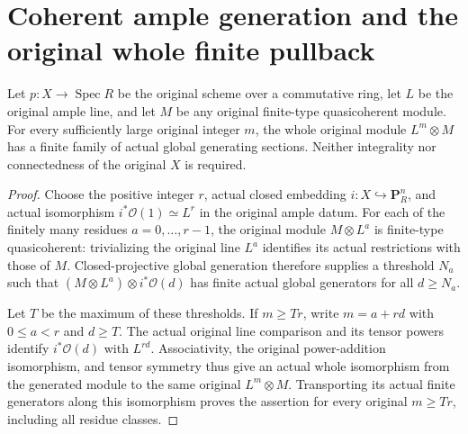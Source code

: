 \section{Coherent ample generation and the original whole finite pullback}

\begin{theorem}
\label{thm:kn-nadel-ample-coherent-generation}
\leanok
{}
Let $p:X\to\operatorname{Spec}R$ be the original scheme over a commutative
ring, let $L$ be the original ample line, and let $M$ be any original
finite-type quasicoherent module. For every sufficiently large original
integer $m$, the whole original module $L^m\otimes M$ has a finite family
of actual global generating sections. Neither integrality nor connectedness
of the original $X$ is required.
\end{theorem}
\begin{proof}
Choose the positive integer $r$, actual closed embedding
$i:X\hookrightarrow\mathbf P^n_R$, and actual isomorphism
$i^*\mathcal O(1)\simeq L^r$ in the original ample datum. For each of
the finitely many residues $a=0,\ldots,r-1$, the original module
$M\otimes L^a$ is finite-type quasicoherent: trivializing the original
line $L^a$ identifies its actual restrictions with those of $M$.
Closed-projective global generation therefore supplies a threshold $N_a$
such that $(M\otimes L^a)\otimes i^*\mathcal O(d)$ has finite actual
global generators for all $d\geq N_a$.

Let $T$ be the maximum of these thresholds. If $m\geq Tr$, write
$m=a+rd$ with $0\leq a<r$ and $d\geq T$. The actual original line
comparison and its tensor powers identify $i^*\mathcal O(d)$ with
$L^{rd}$. Associativity, the original power-addition isomorphism, and
tensor symmetry thus give an actual whole isomorphism from the generated
module to the same original $L^m\otimes M$. Transporting its actual finite
generators along this isomorphism proves the assertion for every original
$m\geq Tr$, including all residue classes.
\end{proof}

